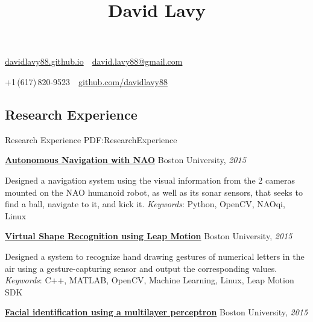 \documentclass[letterpaper,MMMyyyy,nonstop]{simpleresumecv}
\newcommand{\CVAuthor}{David Lavy}
\newcommand{\CVWebpage}{davidlavy88.github.io}
\newcommand*{\TitleFont}{%
      \usefont{\encodingdefault}{\rmdefault}{bx}{n}%
      \fontsize{20}{24}%
      \selectfont}
\begin{document}

\title{\TitleFont \CVAuthor}

\begin{subtitle}
\href{\CVWebpage}
{\CVWebpage}
\,\SubBulletSymbol\,
\href{mailto:david.lavy88@gmail.com}
{david.lavy88@gmail.com}
\par
+1\,(617)\,820-9523
\,\SubBulletSymbol\,
\href{https://github.com/davidlavy88}
{github.com/davidlavy88}

\end{subtitle}

\begin{body}


\section
{Research Experience}
{Research Experience}
{PDF:ResearchExperience}

\href{http://www.bu.edu/vip/files/pubs/reports/DLTM15-06buece.pdf}
{\textbf{Autonomous Navigation with NAO}}
\hfill
Boston University, \textit{2015}

\GapNoBreak
\BulletItem
Designed a navigation system using the visual information from the 2 cameras mounted on the NAO humanoid robot, as well as its sonar sensors, that seeks to find a ball, navigate to it, and kick it.
\GapNoBreak
\textit{Keywords}: Python, OpenCV, NAOqi, Linux

\BigGap
\href{http://www.bu.edu/vip/files/pubs/reports/DLDP15-03buece.pdf}
{\textbf{Virtual Shape Recognition using Leap Motion}}
\hfill
Boston University, \textit{2015}

\GapNoBreak
\BulletItem
Designed a system to recognize hand drawing gestures of numerical letters in the air using a gesture-capturing sensor and  output the corresponding values.
\GapNoBreak
\textit{Keywords}: C++, MATLAB, OpenCV, Machine Learning, Linux, Leap Motion SDK

\BigGap
\href{https://docs.google.com/presentation/d/1328Qvm9VlAZadwlNoU3n5m1REY36m_hGcakSYlxW2vM/edit?ts=565d2938#slide=id.p}
{\textbf{Facial identification using a multilayer perceptron}}
\hfill
Boston University, \textit{2015}


\end{body}
\end{document}
